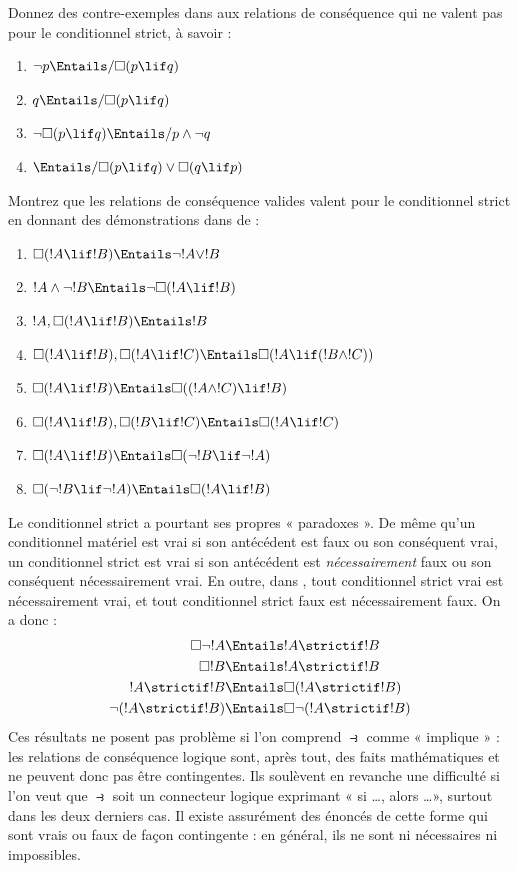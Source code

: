\documentclass[../../../include/open-logic-section]{subfiles}
\begin{document}
\begin{prob}
  Donnez des contre-exemples dans  aux relations de conséquence
  qui ne valent pas pour le conditionnel strict, à savoir :
  \begin{enumerate}
  \item $\lnot p \Entails/ \Box(p \lif q)$
  \item $q \Entails/ \Box(p \lif q)$
  \item $\lnot\Box(p \lif q) \Entails/ p \land \lnot q$
  \item $\Entails/ \Box(p \lif q) \lor \Box(q \lif p)$
  \end{enumerate}
\end{prob}

\begin{prob}
  Montrez que les relations de conséquence valides valent pour le
  conditionnel strict en donnant des démonstrations dans  de :
  \begin{enumerate}
  \item $\Box(!A \lif !B) \Entails \lnot !A \lor !B$
  \item $!A \land \lnot !B \Entails \lnot\Box(!A \lif !B)$
  \item $!A, \Box(!A \lif !B) \Entails !B$
  \item $\Box(!A \lif !B), \Box(!A \lif !C) \Entails \Box(!A \lif (!B
    \land !C))$
  \item $\Box(!A \lif !B) \Entails \Box((!A \land !C) \lif !B)$
  \item $\Box(!A \lif !B), \Box(!B \lif !C) \Entails \Box(!A
    \lif !C)$
  \item $\Box(!A \lif !B) \Entails \Box(\lnot !B \lif \lnot !A)$
  \item $\Box(\lnot !B \lif \lnot !A) \Entails \Box(!A \lif !B)$
  \end{enumerate}
\end{prob}

Le conditionnel strict a pourtant ses propres « paradoxes ». De même
qu'un conditionnel matériel est vrai si son antécédent est faux ou son
conséquent vrai, un conditionnel strict est vrai si son antécédent est
\emph{nécessairement} faux ou son conséquent nécessairement vrai. En
outre, dans , tout conditionnel strict vrai est nécessairement
vrai, et tout conditionnel strict faux est nécessairement faux. On a
donc :
\begin{align}
  \Box \lnot !A & \Entails !A \strictif !B\\
  \Box !B & \Entails !A \strictif !B\\
  !A \strictif !B& \Entails \Box(!A \strictif !B)\\
  \lnot(!A \strictif !B) & \Entails \Box\lnot(!A \strictif !B)
\end{align}
Ces résultats ne posent pas problème si l'on comprend $\strictif$
comme « implique » : les relations de conséquence logique sont, après
tout, des faits mathématiques et ne peuvent donc pas être
contingentes. Ils soulèvent en revanche une difficulté si l'on veut
que $\strictif$ soit un connecteur logique exprimant « si \dots,
alors \dots », surtout dans les deux derniers cas. Il existe
assurément des énoncés de cette forme qui sont vrais ou faux de façon
contingente : en général, ils ne sont ni nécessaires ni impossibles.
\end{document}
